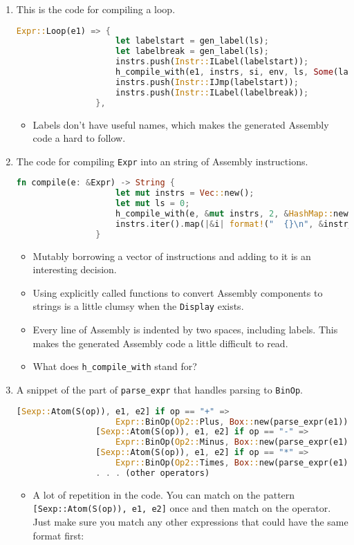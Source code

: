 	\begin{enumerate}
		\item This is the code for compiling a loop.
			\begin{lstlisting}[language=Rust]
				Expr::Loop(e1) => {
				    let labelstart = gen_label(ls);
				    let labelbreak = gen_label(ls);
				    instrs.push(Instr::ILabel(labelstart));
				    h_compile_with(e1, instrs, si, env, ls, Some(labelbreak));
				    instrs.push(Instr::IJmp(labelstart));
				    instrs.push(Instr::ILabel(labelbreak));
				},
			\end{lstlisting}

			\begin{itemize}
				\item Labels don't have useful names, which makes the generated Assembly code a hard to follow.
			\end{itemize}
		\item The code for compiling \verb|Expr| into an string of Assembly instructions.
			\begin{lstlisting}[language=Rust]
				fn compile(e: &Expr) -> String {
				    let mut instrs = Vec::new();
				    let mut ls = 0;
				    h_compile_with(e, &mut instrs, 2, &HashMap::new(), &mut ls, None);
				    instrs.iter().map(|&i| format!("  {}\n", &instr_to_str(i))).fold(String::new(), |acc, s| acc + &s)
				}
			\end{lstlisting}
			\begin{itemize}
				\item Mutably borrowing a vector of instructions and adding to it is an interesting decision.
				\item Using explicitly called functions to convert Assembly components to strings is a little clumsy when the \verb|Display| exists.
				\item Every line of Assembly is indented by two spaces, including labels. This makes the generated Assembly code a little difficult to read.
				\item What does \verb|h_compile_with| stand for?
			\end{itemize}

		\item A snippet of the part of \verb|parse_expr| that handles parsing to \verb|BinOp|.
			\begin{lstlisting}[language=Rust]
				[Sexp::Atom(S(op)), e1, e2] if op == "+" =>
				    Expr::BinOp(Op2::Plus, Box::new(parse_expr(e1)), Box::new(parse_expr(e2))),
				[Sexp::Atom(S(op)), e1, e2] if op == "-" =>
				    Expr::BinOp(Op2::Minus, Box::new(parse_expr(e1)), Box::new(parse_expr(e2))),
				[Sexp::Atom(S(op)), e1, e2] if op == "*" =>
				    Expr::BinOp(Op2::Times, Box::new(parse_expr(e1)), Box::new(parse_expr(e2))),
				. . . (other operators)
			\end{lstlisting}
			\begin{itemize}
				\item A lot of repetition in the code. You can match on the pattern \verb|[Sexp::Atom(S(op)), e1, e2]| once and then match on the operator. Just make sure you match any other expressions that could have the same format first:


\end{itemize}
\end{enumerate}
